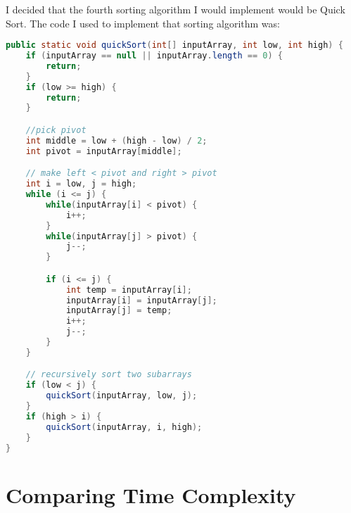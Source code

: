 \documentclass{report}
\begin{document}
I decided that the fourth sorting algorithm I would implement would be Quick Sort. The code I used to implement that sorting algorithm was:

\begin{lstlisting}[language=java, caption=Quicksort implementation]
public static void quickSort(int[] inputArray, int low, int high) {
    if (inputArray == null || inputArray.length == 0) {
        return;
    }
    if (low >= high) {
        return;
    }

    //pick pivot
    int middle = low + (high - low) / 2;
    int pivot = inputArray[middle];

    // make left < pivot and right > pivot
    int i = low, j = high;
    while (i <= j) {
        while(inputArray[i] < pivot) {
            i++;
        }
        while(inputArray[j] > pivot) {
            j--;
        }

        if (i <= j) {
            int temp = inputArray[i];
            inputArray[i] = inputArray[j];
            inputArray[j] = temp;
            i++;
            j--;
        }
    }

    // recursively sort two subarrays
    if (low < j) {
        quickSort(inputArray, low, j);
    }
    if (high > i) {
        quickSort(inputArray, i, high);
    }
}
\end{lstlisting}

\chapter{Comparing Time Complexity}


\end{document}
